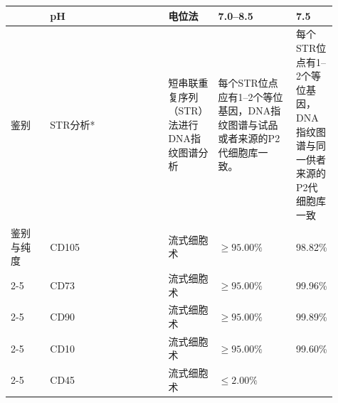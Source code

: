 \documentclass[UTF8,10pt,a4paper,fontset=fandol]{ctexart}
\newcommand{\fieldvalue}[1]{#1}
\begin{document}
\begin{center}
\begin{tabular}{|p{0.13\linewidth}|p{0.40\linewidth}|p{0.13\linewidth}|p{0.25\linewidth}|l|}
&
\fieldvalue{pH} &
\fieldvalue{电位法} &
\fieldvalue{7.0--8.5} &
\fieldvalue{7.5}
\\ \hline
鉴别 &
\fieldvalue{STR分析*} &
\fieldvalue{短串联重复序列（STR）法进行DNA指纹图谱分析} &
\fieldvalue{每个STR位点应有1--2个等位基因，DNA指纹图谱与试品或者来源的P2代细胞库一致。} &
\fieldvalue{每个STR位点有1--2个等位基因，DNA指纹图谱与同一供者来源的P2代细胞库一致}
\\ \hline
鉴别与纯度 &
\fieldvalue{CD105} &
\fieldvalue{流式细胞术} &
\fieldvalue{$\geq95.00\%$} &
\fieldvalue{98.82\%}
\\ \cline{2-5}
&
\fieldvalue{CD73} &
\fieldvalue{流式细胞术} &
\fieldvalue{$\geq95.00\%$} &
\fieldvalue{99.96\%}
\\ \cline{2-5}
&
\fieldvalue{CD90} &
\fieldvalue{流式细胞术} &
\fieldvalue{$\geq95.00\%$} &
\fieldvalue{99.89\%}
\\ \cline{2-5}
&
\fieldvalue{CD10} &
\fieldvalue{流式细胞术} &
\fieldvalue{$\geq95.00\%$} &
\fieldvalue{99.60\%}
\\ \cline{2-5}
&
\fieldvalue{CD45} &
\fieldvalue{流式细胞术} &
\fieldvalue{$\leq2.00\%$} &

\end{tabular}
\end{center}
\end{document}

